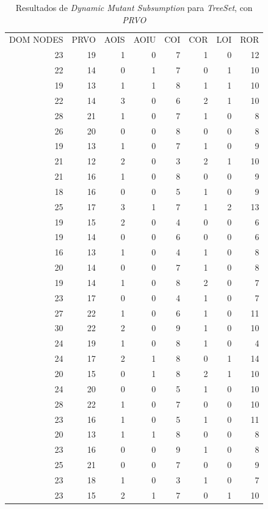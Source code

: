 \begin{table}[]
	\caption[\emph{Dynamic Mutant Subsumption} \emph{TreeSet}, con \emph{PRVO}]{Resultados de \emph{Dynamic Mutant Subsumption} para \emph{TreeSet}, con \emph{PRVO}}
	\label{tables.results.subsumption.treeset.prvo}
	\centering
	\scriptsize
	\def\arraystretch{0.95}
	\setlength\tabcolsep{0.5mm}
	\begin{tabular}{rrrrrrrr}
		DOM NODES & PRVO & AOIS & AOIU & COI & COR & LOI & ROR \\
		23 & 19 & 1 & 0 & 7 & 1 & 0 & 12 \\
		22 & 14 & 0 & 1 & 7 & 0 & 1 & 10 \\
		19 & 13 & 1 & 1 & 8 & 1 & 1 & 10 \\
		22 & 14 & 3 & 0 & 6 & 2 & 1 & 10 \\
		28 & 21 & 1 & 0 & 7 & 1 & 0 & 8 \\
		26 & 20 & 0 & 0 & 8 & 0 & 0 & 8 \\
		19 & 13 & 1 & 0 & 7 & 1 & 0 & 9 \\
		21 & 12 & 2 & 0 & 3 & 2 & 1 & 10 \\
		21 & 16 & 1 & 0 & 8 & 0 & 0 & 9 \\
		18 & 16 & 0 & 0 & 5 & 1 & 0 & 9 \\
		25 & 17 & 3 & 1 & 7 & 1 & 2 & 13 \\
		19 & 15 & 2 & 0 & 4 & 0 & 0 & 6 \\
		19 & 14 & 0 & 0 & 6 & 0 & 0 & 6 \\
		16 & 13 & 1 & 0 & 4 & 1 & 0 & 8 \\
		20 & 14 & 0 & 0 & 7 & 1 & 0 & 8 \\
		19 & 14 & 1 & 0 & 8 & 2 & 0 & 7 \\
		23 & 17 & 0 & 0 & 4 & 1 & 0 & 7 \\
		27 & 22 & 1 & 0 & 6 & 1 & 0 & 11 \\
		30 & 22 & 2 & 0 & 9 & 1 & 0 & 10 \\
		24 & 19 & 1 & 0 & 8 & 1 & 0 & 4 \\
		24 & 17 & 2 & 1 & 8 & 0 & 1 & 14 \\
		20 & 15 & 0 & 1 & 8 & 2 & 1 & 10 \\
		24 & 20 & 0 & 0 & 5 & 1 & 0 & 10 \\
		28 & 22 & 1 & 0 & 7 & 0 & 0 & 10 \\
		23 & 16 & 1 & 0 & 5 & 1 & 0 & 11 \\
		20 & 13 & 1 & 1 & 8 & 0 & 0 & 8 \\
		23 & 16 & 0 & 0 & 9 & 1 & 0 & 8 \\
		25 & 21 & 0 & 0 & 7 & 0 & 0 & 9 \\
		23 & 18 & 1 & 0 & 3 & 1 & 0 & 7 \\
		23 & 15 & 2 & 1 & 7 & 0 & 1 & 10
	\end{tabular}
\end{table}

